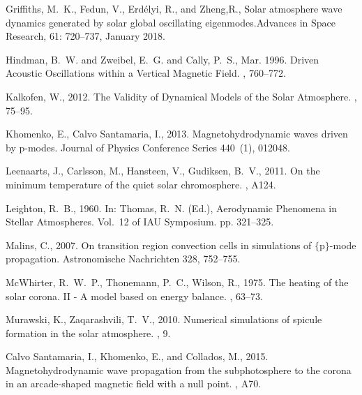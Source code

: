 \documentclass[twocolumn]{aastex62}
\begin{document}
\begin{thebibliography}{}
{Griffiths}, M.~K., {Fedun}, V., {Erd{\'e}lyi}, R., and {Zheng},R.,
{Solar atmosphere wave dynamics generated by solar global oscillating
  eigenmodes}.{Advances in Space Research}, 61: 720--737, January 2018.


{Hindman}, B.~W. and {Zweibel}, E.~G. and {Cally}, P.~S., Mar. 1996. {Driven Acoustic Oscillations within a Vertical Magnetic Field}. , 760--772.

{Kalkofen}, W., 2012. {The Validity of Dynamical Models of the Solar
  Atmosphere}. , 75--95.

{Khomenko}, E., {Calvo Santamaria}, I., 2013. {Magnetohydrodynamic waves driven
  by p-modes}. Journal of Physics Conference Series 440~(1), 012048.

{Leenaarts}, J., {Carlsson}, M., {Hansteen}, V., {Gudiksen}, B.~V., 2011. {On
  the minimum temperature of the quiet solar chromosphere}. , A124.


{Leighton}, R.~B., 1960. In: {Thomas}, R.~N. (Ed.), Aerodynamic Phenomena in
  Stellar Atmospheres. Vol.~12 of IAU Symposium. pp. 321--325.

{Malins}, C., 2007. {On transition region convection cells in simulations of
  $\{$p$\}$-mode propagation}. Astronomische Nachrichten 328, 752--755.


{McWhirter}, R.~W.~P., {Thonemann}, P.~C., {Wilson}, R., 1975. {The heating of
  the solar corona. II - A model based on energy balance}. , 63--73.

{Murawski}, K., {Zaqarashvili}, T.~V., 2010. {Numerical simulations of spicule
  formation in the solar atmosphere}. , 9.

 {Calvo Santamaria}, I., {Khomenko}, E.,  and {Collados}, M., 2015. {Magnetohydrodynamic wave propagation from the subphotosphere to the corona in an arcade-shaped magnetic field with a null point}. , A70.


\end{thebibliography}
\end{document}
